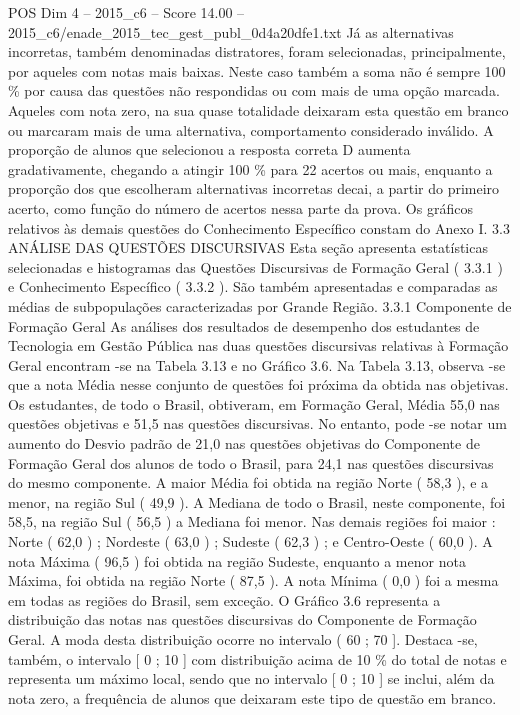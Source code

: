 \begin{textsample}{POS Dim 4 – 2015\_c6 – Score 14.00 – 2015\_c6/enade\_2015\_tec\_gest\_publ\_0d4a20dfe1.txt}
Já as alternativas incorretas, também denominadas distratores, foram selecionadas, principalmente, por aqueles com notas mais baixas.
Neste caso também a soma não é sempre 100 \% por causa das questões não respondidas ou com mais de uma opção marcada.
Aqueles com nota zero, na sua quase totalidade deixaram esta questão em branco ou marcaram mais de uma alternativa, comportamento considerado inválido.
A proporção de alunos que selecionou a resposta correta D aumenta gradativamente, chegando a atingir 100 \% para 22 acertos ou mais, enquanto a proporção dos que escolheram alternativas incorretas decai, a partir do primeiro acerto, como função do número de acertos nessa parte da prova.
Os gráficos relativos às demais questões do Conhecimento Específico constam do Anexo I. 3.3 ANÁLISE DAS QUESTÕES DISCURSIVAS Esta seção apresenta estatísticas selecionadas e histogramas das Questões Discursivas de Formação Geral ( 3.3.1 ) e Conhecimento Específico ( 3.3.2 ).
São também apresentadas e comparadas as médias de subpopulações caracterizadas por Grande Região. 3.3.1 Componente de Formação Geral As análises dos resultados de desempenho dos estudantes de Tecnologia em Gestão Pública nas duas questões discursivas relativas à Formação Geral encontram -se na Tabela 3.13 e no Gráfico 3.6.
Na Tabela 3.13, observa -se que a nota Média nesse conjunto de questões foi próxima da obtida nas objetivas.
Os estudantes, de todo o Brasil, obtiveram, em Formação Geral, Média 55,0 nas questões objetivas e 51,5 nas questões discursivas.
No entanto, pode -se notar um aumento do Desvio padrão de 21,0 nas questões objetivas do Componente de Formação Geral dos alunos de todo o Brasil, para 24,1 nas questões discursivas do mesmo componente.
A maior Média foi obtida na região Norte ( 58,3 ), e a menor, na região Sul ( 49,9 ).
A Mediana de todo o Brasil, neste componente, foi 58,5, na região Sul ( 56,5 ) a Mediana foi menor.
Nas demais regiões foi maior : Norte ( 62,0 ) ; Nordeste ( 63,0 ) ; Sudeste ( 62,3 ) ; e Centro-Oeste ( 60,0 ).
A nota Máxima ( 96,5 ) foi obtida na região Sudeste, enquanto a menor nota Máxima, foi obtida na região Norte ( 87,5 ).
A nota Mínima ( 0,0 ) foi a mesma em todas as regiões do Brasil, sem exceção.
O Gráfico 3.6 representa a distribuição das notas nas questões discursivas do Componente de Formação Geral.
A moda desta distribuição ocorre no intervalo ( 60 ; 70 ].
Destaca -se, também, o intervalo [ 0 ; 10 ] com distribuição acima de 10 \% do total de notas e representa um máximo local, sendo que no intervalo [ 0 ; 10 ] se inclui, além da nota zero, a frequência de alunos que deixaram este tipo de questão em branco.

\end{textsample}

